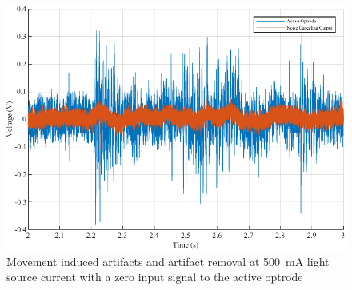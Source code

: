 \begin{figure}[h]
\centerline{\includegraphics[scale=1]{5-Experiment/Movement Artifact.pdf}}
\caption{Movement induced artifacts and artifact removal at \qty{500}{\mA} light source current with a zero input signal to the active optrode}
\label{fig_Movement Artifact}
\end{figure}

